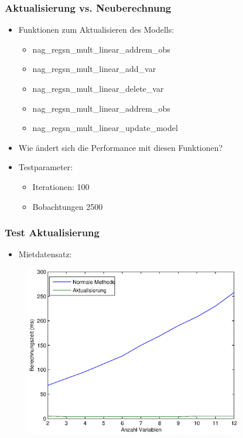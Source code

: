 \documentclass{beamer}
\begin{document}
\begin{frame}
  \frametitle{Aktualisierung vs. Neuberechnung}
    
  \begin{itemize}
  \item Funktionen zum Aktualisieren des Modells:
    \begin{itemize}
    \item nag\_regsn\_mult\_linear\_addrem\_obs
    \item \alert<3>{nag\_regsn\_mult\_linear\_add\_var}
    \item nag\_regsn\_mult\_linear\_delete\_var
    \item nag\_regsn\_mult\_linear\_addrem\_obs
    \item \alert<3>{nag\_regsn\_mult\_linear\_update\_model}
    \end{itemize}
  \end{itemize}

  \pause

  \begin{itemize}
  \item Wie ändert sich die Performance mit diesen Funktionen?
  \end{itemize}

  \pause

  \begin{itemize}
  \item Testparameter:
    \begin{itemize}
    \item Iterationen: 100
    \item Bobachtungen 2500
    \end{itemize}
  \end{itemize}

\end{frame}

\begin{frame}
  \frametitle{Test Aktualisierung}
  
  \begin{itemize}
  \item Mietdatensatz:
  \end{itemize}

  \begin{figure}[t]
    \centering
    \includegraphics[width=9.5cm]{figures/multi_reg_vars_2500_obs_act.eps}
  \end{figure}

\end{frame}
\end{document}
